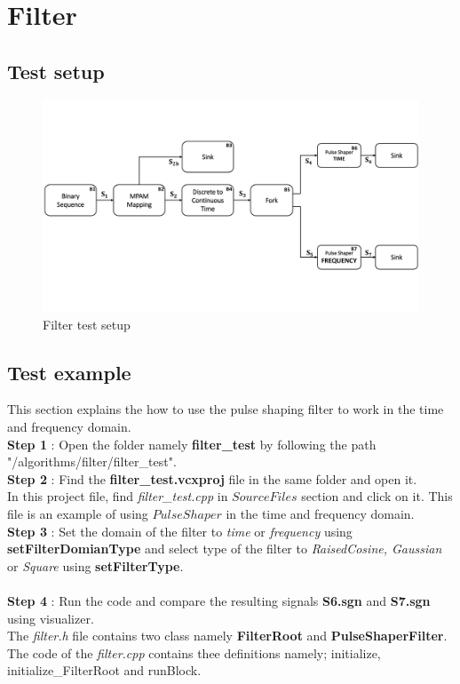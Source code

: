 \section{Filter}
\subsection*{Test setup}
\begin{figure}[h]
	\centering
	\includegraphics[width=14cm]{./algorithms/filter/figures/Test_Filter_Dia.pdf}
	\caption{Filter test setup}
	\label{FilterTest}
\end{figure}

\subsection*{Test example}
This section explains the how to use the pulse shaping filter to work in the time and frequency domain.\\
\textbf{Step 1} : Open the folder namely \textbf{filter\_test} by following the path  "/algorithms/filter/filter\_test".\\ 
\textbf{Step 2} : Find the \textbf{filter\_test.vcxproj} file in the same folder and open it.\\
In this project file, find \textit{filter\_test.cpp} in $Source Files$ section and click on it. This file is an example of using $PulseShaper$ in the time and frequency domain.\\

\textbf{Step 3} : Set the domain of the filter to \textit{time} or \textit{frequency} using \textbf{setFilterDomianType} and select type of the filter to \textit{ RaisedCosine, Gaussian} or \textit{Square} using \textbf{setFilterType}.\\ \\
\textbf{Step 4} : Run the code and compare the resulting signals \textbf{S6.sgn} and \textbf{S7.sgn} using visualizer.\\
The \textit{filter.h} file contains two class namely \textbf{FilterRoot} and \textbf{PulseShaperFilter}.\\

The code of the \textit{filter.cpp} contains thee definitions namely; initialize, initialize\_FilterRoot and runBlock.

\newpage
